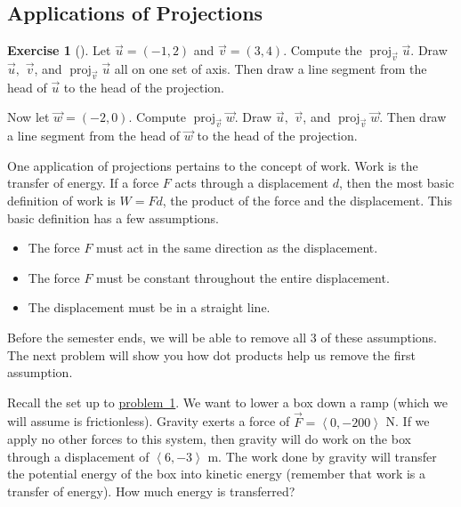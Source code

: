 \documentclass[10pt,]{book}
\theoremstyle{plain}
\theoremstyle{definition}
\theoremstyle{definition}
\theoremstyle{definition}
\theoremstyle{definition}
\newtheorem{exploration}[project]{Exercise}
\theoremstyle{definition}
\numberwithin{equation}{section}
\DeclareMathOperator{\proj}{proj}
\newcommand{\lt}{<}
\begin{document}
\subsection[{Applications of Projections}]{Applications of Projections}\label{subsection-14}
\begin{exploration}[]\label{exploration-51}
Let \(\vec u=(-1,2)\) and \(\vec v=(3,4)\). Compute the \(\proj_{\vec v}\vec u\). Draw \(\vec u,\) \(\vec v\), and \(\proj_{\vec v}\vec u\) all on one set of axis. Then draw a line segment from the head of \(\vec u\) to the head of the projection.%
\par
Now let \(\vec w=(-2,0)\). Compute \(\proj_{\vec v}\vec w\). Draw \(\vec u,\) \(\vec v\), and \(\proj_{\vec v}\vec w\). Then draw a line segment from the head of \(\vec w\) to the head of the projection.%
\end{exploration}
One application of projections pertains to the concept of work. Work is the transfer of energy. If a force \(F\) acts through a displacement \(d\), then the most basic definition of work is \(W=Fd\), the product of the force and the displacement. This basic definition has a few assumptions. \leavevmode%
\begin{itemize}[label=\textbullet]
\item{}The force \(F\) must act in the same direction as the displacement.%
\item{}The force \(F\) must be constant throughout the entire displacement.%
\item{}The displacement must be in a straight line.%
\end{itemize}
%
\par
Before the semester ends, we will be able to remove all 3 of these assumptions. The next problem will show you how dot products help us remove the first assumption.%
\par
Recall the set up to \hyperref[prob_force_intro]{problem~1}. We want to lower a box down a ramp (which we will assume is frictionless). Gravity exerts a force of \(\vec F=\left\lt 0,-200\right>\) N. If we apply no other forces to this system, then gravity will do work on the box through a displacement of \(\left\lt 6,-3\right>\) m. The work done by gravity will transfer the potential energy of the box into kinetic energy (remember that work is a transfer of energy). How much energy is transferred?%
\end{document}
